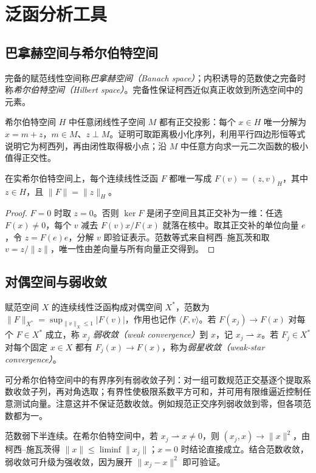 \setcounter{chapter}{2} %
\chapter{泛函分析工具}
\label{app:functional}

\section{巴拿赫空间与希尔伯特空间}
完备的赋范线性空间称\emph{巴拿赫空间（Banach space）}；内积诱导的范数使之完备时称\emph{希尔伯特空间（Hilbert space）}。完备性保证柯西近似真正收敛到所选空间中的元素。

希尔伯特空间 $H$ 中任意闭线性子空间 $M$ 都有正交投影：每个 $x\in H$ 唯一分解为 $x=m+z$，$m\in M$、$z\perp M$。证明可取距离极小化序列，利用平行四边形恒等式说明它为柯西列，再由闭性取得极小点；沿 $M$ 中任意方向求一元二次函数的极小值得正交性。

\begin{theorem}
在实希尔伯特空间上，每个连续线性泛函 $F$ 都唯一写成 $F(v)=(z,v)_H$，其中 $z\in H$，且 $\|F\|=\|z\|_H$。
\end{theorem}
\begin{proof}
$F=0$ 时取 $z=0$。否则 $\ker F$ 是闭子空间且其正交补为一维：任选 $F(x)\ne0$，每个 $v$ 减去 $F(v)x/F(x)$ 就落在核中。取其正交补的单位向量 $e$，令 $z=F(e)e$，分解 $v$ 即验证表示。范数等式来自柯西--施瓦茨和取 $v=z/\|z\|$，唯一性由差向量与所有向量正交得到。
\end{proof}

\section{对偶空间与弱收敛}
赋范空间 $X$ 的连续线性泛函构成对偶空间 $X^*$，范数为 $\|F\|_{X^*}=\sup_{\|v\|_X\le1}|F(v)|$，作用也记作 $\langle F,v\rangle$。若 $F(x_j)\to F(x)$ 对每个 $F\in X^*$ 成立，称 $x_j$ \emph{弱收敛（weak convergence）}到 $x$，记 $x_j\rightharpoonup x$。若 $F_j\in X^*$ 对每个固定 $x\in X$ 都有 $F_j(x)\to F(x)$，称为\emph{弱星收敛（weak-star convergence）}。

可分希尔伯特空间中的有界序列有弱收敛子列：对一组可数规范正交基逐个提取系数收敛子列，再对角选取；有界性使极限系数平方可和，并可用有限维逼近控制任意测试向量。注意这并不保证范数收敛。例如规范正交序列弱收敛到零，但各项范数都为一。

范数弱下半连续。在希尔伯特空间中，若 $x_j\rightharpoonup x\ne0$，则 $(x_j,x)\to\|x\|^2$，由柯西--施瓦茨得 $\|x\|\le\liminf\|x_j\|$；$x=0$ 时结论直接成立。结合范数收敛，弱收敛可升级为强收敛，因为展开 $\|x_j-x\|^2$ 即可验证。


